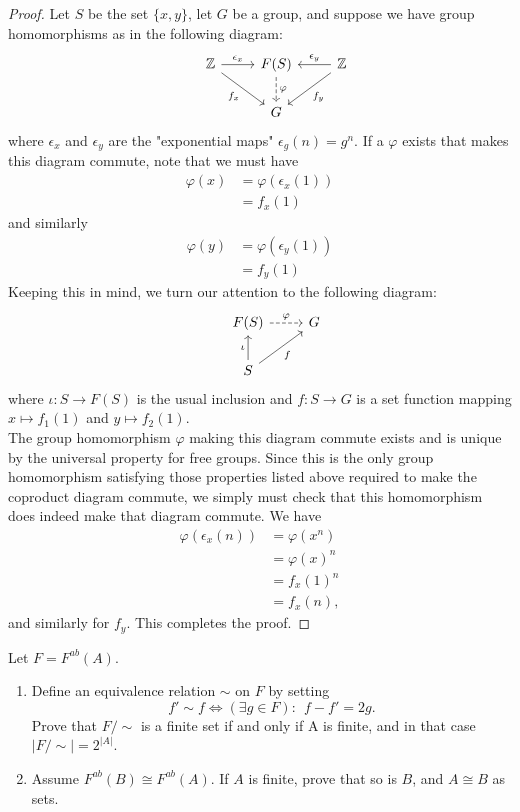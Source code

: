 \documentclass[12pt]{article}
\newenvironment{problem}[2][Problem]{\begin{trivlist}
\item[\hskip \labelsep {\bfseries #1}\hskip \labelsep {\bfseries #2.}]}{\end{trivlist}}
\begin{document}
\begin{proof}
  Let $S$ be the set $\{x,y\}$, let $G$ be a group,
  and suppose we have group homomorphisms as in the following diagram:
  \[ \begin{tikzcd}
    & \mathbb{Z} 
    \ar{r}{\epsilon_x} 
    \ar{dr}[swap]{f_x}
    & F(S)
    \ar[dashed]{d}{\varphi}
    & \mathbb{Z}
    \ar{l}[swap]{\epsilon_y}
    \ar{dl}{f_y}
    \\
    & & G &
  \end{tikzcd} \]
  where $\epsilon_x$ and $\epsilon_y$ are the "exponential maps" $\epsilon_g(n) = g^n$.
  If a $\varphi$ exists that makes this diagram commute, note that we must have
  \begin{align*}
    \varphi(x) &= \varphi(\epsilon_x(1)) \\
    &= f_x(1)
  \end{align*}
  and similarly
  \begin{align*}
    \varphi(y) &= \varphi(\epsilon_y(1)) \\
    &= f_y(1)
  \end{align*}
  Keeping this in mind, we turn our attention to the following diagram:
  \[\begin{tikzcd}
      & F(S) \ar[dashed]{r}{\varphi} & G \\
      & S \ar{u}{\iota} \ar{ur}[swap]{f} &
  \end{tikzcd}\]
  where $\iota:S\to F(S)$ is the usual inclusion and $f:S\to G$ is a set function mapping
  $x\mapsto f_1(1)$ and $y\mapsto f_2(1)$.\\
  The group homomorphism $\varphi$ making this diagram commute exists and is unique by the 
  universal property for free groups.
  Since this is the only group homomorphism satisfying those properties listed above required to 
  make the coproduct diagram commute, we simply must check that this homomorphism does indeed
  make that diagram commute.
  We have
  \begin{align*}
    \varphi(\epsilon_x(n)) &= \varphi(x^n) \\
    &= \varphi(x)^n \\
    &= f_x(1)^n \\
    &= f_x(n),
  \end{align*}
  and similarly for $f_y$. This completes the proof.
\end{proof}
\begin{problem}{5.10}
  Let $F=F^{ab}(A)$.
  \begin{enumerate}
    \item Define an equivalence relation $\sim$ on $F$ by setting 
      \begin{equation*}
        f'\sim f \Leftrightarrow (\exists g\in F):~~ f-f' = 2g.
      \end{equation*}
      Prove that $F/{\sim}$ is a finite set if and only if A is finite, and in that case 
      $|F/{\sim}| = 2^{|A|}$.
    \item Assume $F^{ab}(B) \cong F^{ab}(A)$. If $A$ is finite, prove that so is $B$, 
      and $A\cong B$ as sets.
  \end{enumerate}
\end{problem}
\end{document}
